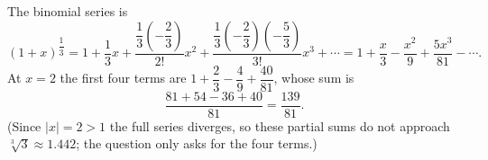 The binomial series is
\[(1+x)^{\dfrac{1}{3}}=1+\dfrac{1}{3}x+\dfrac{\dfrac{1}{3}\left(-\dfrac{2}{3}\right)}{2!}x^2+\dfrac{\dfrac{1}{3}\left(-\dfrac{2}{3}\right)\left(-\dfrac{5}{3}\right)}{3!}x^3+\cdots=1+\dfrac{x}{3}-\dfrac{x^2}{9}+\dfrac{5x^3}{81}-\cdots.\]
At $x=2$ the first four terms are $1+\dfrac{2}{3}-\dfrac{4}{9}+\dfrac{40}{81}$, whose sum is
\[\dfrac{81+54-36+40}{81}=\boxed{\dfrac{139}{81}}.\]
(Since $|x|=2>1$ the full series diverges, so these partial sums do not approach $\sqrt[3]{3}\approx1.442$; the question only asks for the four terms.)
